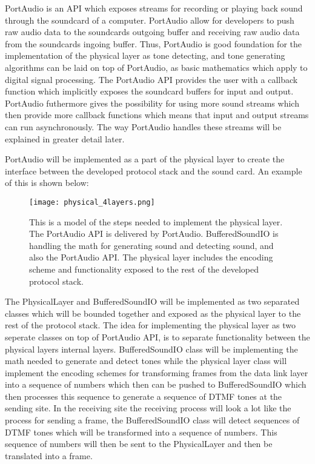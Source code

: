 	PortAudio is an API which exposes streams for recording or playing back sound through the soundcard of a
	computer. PortAudio allow for developers to push raw audio data to the soundcards outgoing buffer and
	receiving raw audio data from the soundcards ingoing buffer. Thus, PortAudio is good foundation for the
	implementation of the physical layer as tone detecting, and tone generating algorithms can be laid on top
	of PortAudio, as basic mathematics which apply to digital signal processing. The PortAudio API provides the
	user with a callback function which implicitly exposes the soundcard buffers for input and output. PortAudio
	futhermore gives the possibility for using more sound streams which then provide more callback functions
	which means that input and output streams can run asynchronously. The way PortAudio handles these streams
	will be explained in greater detail later.
	
	PortAudio will be implemented as a part of the physical layer to create the interface between the developed
	protocol stack and the sound card. An example of this is shown below:
	
	\begin{figure}[htb]
		\begin{center}
		\texttt{[image: physical\_4layers.png]}%
		\caption{This is a model of the steps needed to implement the physical layer. The PortAudio API is delivered
		by PortAudio. BufferedSoundIO is handling the math for generating sound and detecting sound, and also the
		PortAudio API. The physical layer includes the encoding scheme and functionality exposed to the rest of the
		developed protocol stack.}
		\label{fig:physical_4layers}
		\end{center}
	\end{figure}
	
	The PhysicalLayer and BufferedSoundIO will be implemented as two separated classes which will be bounded together
	and exposed as the physical layer to the rest of the protocol stack. The idea for implementing the physical layer
	as two seperate classes on top of PortAudio API, is to separate functionality between the physical layers internal
	layers. BufferedSoundIO class will be implementing the math needed to generate and detect tones while the physical
	layer class will implement the encoding schemes for transforming frames from the data link layer into a sequence of
	numbers which then can be pushed to BufferedSoundIO which then processes this sequence to generate a sequence of DTMF
	tones at the sending site. In the receiving site the receiving process will look a lot like the process for sending a
	frame, the BufferedSoundIO class will detect sequences of DTMF tones which will be transformed into a sequence of
	numbers. This sequence of numbers will then be sent to the PhysicalLayer and then be translated into a frame.
	
